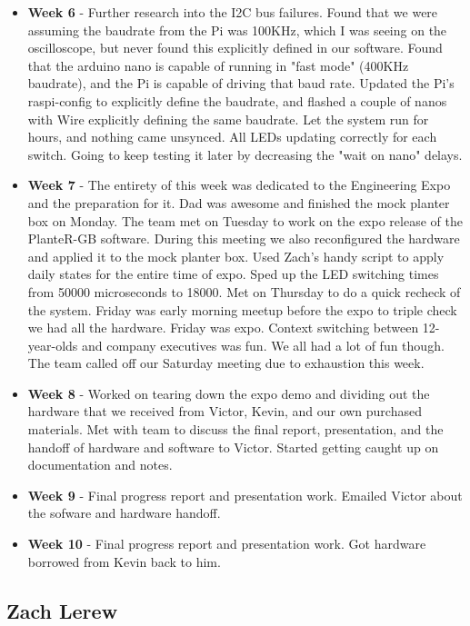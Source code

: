 \documentclass[onecolumn, draftclsnofoot,10pt, compsoc]{IEEEtran}
\begin{document}
\begin{itemize}
					\item \textbf{Week 6} - Further research into the I2C bus failures. Found that we were assuming the baudrate from the Pi was 100KHz, which I was seeing on the oscilloscope, but never found this explicitly defined in our software. Found that the arduino nano is capable of running in "fast mode" (400KHz baudrate), and the Pi is capable of driving that baud rate. Updated the Pi's raspi-config to explicitly define the baudrate, and flashed a couple of nanos with Wire explicitly defining the same baudrate. Let the system run for hours, and nothing came unsynced. All LEDs updating correctly for each switch. Going to keep testing it later by decreasing the "wait on nano" delays.
					\item \textbf{Week 7} - The entirety of this week was dedicated to the Engineering Expo and the preparation for it. Dad was awesome and finished the mock planter box on Monday. The team met on Tuesday to work on the expo release of the PlanteR-GB software. During this meeting we also reconfigured the hardware and applied it to the mock planter box. Used Zach's handy script to apply daily states for the entire time of expo. Sped up the LED switching times from 50000 microseconds to 18000. Met on Thursday to do a quick recheck of the system. Friday was early morning meetup before the expo to triple check we had all the hardware. Friday was expo. Context switching between 12-year-olds and company executives was fun. We all had a lot of fun though. The team called off our Saturday meeting due to exhaustion this week.
					\item \textbf{Week 8} - Worked on tearing down the expo demo and dividing out the hardware that we received from Victor, Kevin, and our own purchased materials. Met with team to discuss the final report, presentation, and the handoff of hardware and software to Victor. Started getting caught up on documentation and notes.
					\item \textbf{Week 9} - Final progress report and presentation work. Emailed Victor about the sofware and hardware handoff.  
					\item \textbf{Week 10} - Final progress report and presentation work. Got hardware borrowed from Kevin back to him.
				\end{itemize}
		\subsection{Zach Lerew}
\end{document}
